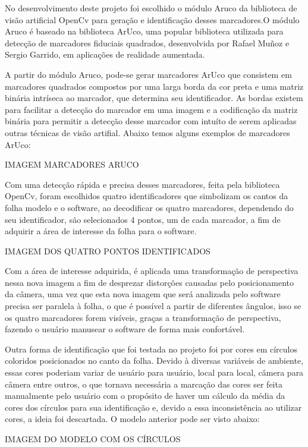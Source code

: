 \documentclass[12pt]{report}
\begin{document}
No desenvolvimento deste projeto foi escolhido o módulo Aruco da biblioteca de visão artificial OpenCv para geração e identificação desses marcadores.O módulo Aruco é baseado na biblioteca ArUco, uma popular biblioteca utilizada para detecção de marcadores fiduciais quadrados, desenvolvida por Rafael Muñoz e Sergio Garrido, em aplicações de realidade aumentada.

A partir do módulo Aruco, pode-se gerar marcadores ArUco que consistem em marcadores quadrados compostos por uma larga borda da cor preta e uma matriz binária intríseca ao marcador, que determina seu identificador. As bordas existem para facilitar a detecção do marcador em uma imagem e a codificação da matriz binária para permitir a detecção desse marcador com intuíto de serem aplicadas outras técnicas de visão artifial. Abaixo temos alguns exemplos de marcadores ArUco:

IMAGEM MARCADORES ARUCO

Com uma detecção rápida e precisa desses marcadores, feita pela biblioteca OpenCv, foram escolhidos quatro identificadores que simbolizam os cantos da folha modelo e o software, ao decodificar os quatro marcadores, dependendo do seu identificador, são selecionados 4 pontos, um de cada marcador, a fim de adquirir a área de interesse da folha para o software.

IMAGEM DOS QUATRO PONTOS IDENTIFICADOS

Com a área de interesse adquirida, é aplicada uma transformação de perspectiva nessa nova imagem a fim de  desprezar distorções causadas pelo posicionamento da câmera, uma vez que esta nova imagem que será analizada pelo software precisa ser paralela à folha, o que é possível a partir de diferentes ângulos, isso se os quatro marcadores forem visíveis, graças a transformação de perspectiva, fazendo o usuário manusear o software de forma mais confortável.

Outra forma de identificação que foi testada no projeto foi por cores em círculos coloridos posicionados no canto da folha. Devido à diversas variáveis de ambiente, essas cores poderiam variar de usuário para usuário, local para local, câmera para câmera entre outros, o que tornava necessária a marcação das cores ser feita manualmente pelo usuário com o propósito de haver um cálculo da média da cores dos círculos para sua identificação e, devido a essa inconsistência ao utilizar cores, a ideia foi descartada. O modelo anterior pode ser visto abaixo:

IMAGEM DO MODELO COM OS CÍRCULOS
\end{document}
